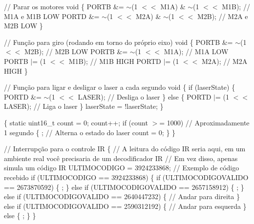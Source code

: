 // Parar os motores void  \{ PORTB \&= \texorpdfstring{$\sim$}{\string~}(1 \texorpdfstring{$<$}{<}\texorpdfstring{$<$}{<} M1A) \& \texorpdfstring{$\sim$}{\string~}(1 \texorpdfstring{$<$}{<}\texorpdfstring{$<$}{<} M1B); // M1A e M1B LOW PORTD \&= \texorpdfstring{$\sim$}{\string~}(1 \texorpdfstring{$<$}{<}\texorpdfstring{$<$}{<} M2A) \& \texorpdfstring{$\sim$}{\string~}(1 \texorpdfstring{$<$}{<}\texorpdfstring{$<$}{<} M2B); // M2A e M2B LOW \}

// Função para giro (rodando em torno do próprio eixo) void  \{ PORTB \&= \texorpdfstring{$\sim$}{\string~}(1 \texorpdfstring{$<$}{<}\texorpdfstring{$<$}{<} M2B); // M2B LOW PORTB \&= \texorpdfstring{$\sim$}{\string~}(1 \texorpdfstring{$<$}{<}\texorpdfstring{$<$}{<} M1A); // M1A LOW PORTB \texorpdfstring{$\vert$}{|}= (1 \texorpdfstring{$<$}{<}\texorpdfstring{$<$}{<} M1B); // M1B HIGH PORTD \texorpdfstring{$\vert$}{|}= (1 \texorpdfstring{$<$}{<}\texorpdfstring{$<$}{<} M2A); // M2A HIGH \}

// Função para ligar e desligar o laser a cada segundo void  \{ if (laser\+State) \{ PORTD \&= \texorpdfstring{$\sim$}{\string~}(1 \texorpdfstring{$<$}{<}\texorpdfstring{$<$}{<} LASER); // Desliga o laser \} else \{ PORTD \texorpdfstring{$\vert$}{|}= (1 \texorpdfstring{$<$}{<}\texorpdfstring{$<$}{<} LASER); // Liga o laser \} laser\+State = !laser\+State; \}

 \{ static uint16\+\_\+t count = 0; count++; if (count \texorpdfstring{$>$}{>}= 1000) // Aproximadamente 1 segundo \{ ; // Alterna o estado do laser count = 0; \} \}

// Interrupção para o controle IR  \{ // A leitura do código IR seria aqui, em um ambiente real você precisaria de um decodificador IR // Em vez disso, apenas simula um código IR ULTIMOCODIGO = 3924233868; // Exemplo de código recebido if (ULTIMOCODIGO == 3924233868) \{ if (ULTIMOCODIGOVALIDO == 2673870592) \{ ; \} else if (ULTIMOCODIGOVALIDO == 2657158912) \{ ; \} else if (ULTIMOCODIGOVALIDO == 2640447232) \{ // Andar para direita \} else if (ULTIMOCODIGOVALIDO == 2590312192) \{ // Andar para esquerda \} else \{ ; \} \}

